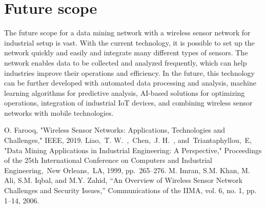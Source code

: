 \documentclass[conference]{IEEEtran}
\begin{document}
\section{Future scope}
The future scope for a data mining network with a wireless sensor network for industrial setup is vast. With the current technology, it is possible to set up the network quickly and easily and integrate many different types of sensors. The network enables data to be collected and analyzed frequently, which can help industries improve their operations and efficiency. In the future, this technology can be further developed with automated data processing and analysis, machine learning algorithms for predictive analysis, AI-based solutions for optimizing operations, integration of industrial IoT devices, and combining wireless sensor networks with mobile technologies.

\begin{thebibliography}{00}
 O. Farooq, "Wireless Sensor Networks: Applications, Technologies and Challenges," IEEE, 2019.
 Liao, T. W. , Chen, J. H. , and Triantaphyllou, E, "Data Mining Applications in Industrial Engineering: A Perspective," Proceedings of the 25th International Conference on Computers and Industrial Engineering, New Orleans, LA, 1999, pp. 265–276.
 M. Imran, S.M. Khan, M. Ali, S.M. Iqbal, and M.Y. Zahid, “An Overview of Wireless Sensor Network Challenges and Security Issues,” Communications of the IIMA, vol. 6, no. 1, pp. 1–14, 2006.
\end{thebibliography}
\end{document}

